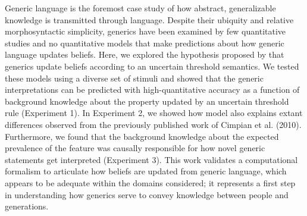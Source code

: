 \documentclass[floatsintext,doc]{apa6}
\begin{document}
Generic language is the foremost case study of how abstract, generalizable knowledge is transmitted through language.
Despite their ubiquity and relative morphosyntactic simplicity, generics have been examined by few quantitative studies and no quantitative models that make predictions about how generic language updates beliefs.
Here, we explored the hypothesis proposed by  that generics update beliefs according to an uncertain threshold semantics. 
We tested these models using a diverse set of stimuli and showed that the generic interpretations can be predicted with high-quantitative accuracy as a function of background knowledge about the property updated by an uncertain threshold rule (Experiment 1).
In Experiment 2, we showed how model also explains extant differences observed from the previously published work of Cimpian et al. (2010).
Furthermore, we found that the background knowledge about the expected prevalence of the feature was causally responsible for how novel generic statements get interpreted (Experiment 3).
This work validates a computational formalism to articulate how beliefs are updated from generic language, which appears to be adequate within the domains considered; it represents a first step in understanding how generics serve to convey knowledge between people and generations.
\end{document}
